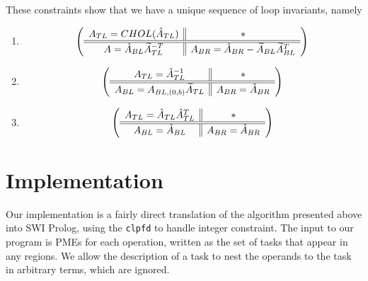 \documentclass[12pt,letterpaper]{article}
\newcommand*{\opF}{\mathcal{F}}
\begin{document}
These constraints show that we have a unique sequence of loop invariants, namely
\begin{enumerate}
\item
  \begin{equation*}
  \left( \begin{array}{c || c} A_{TL}  = CHOL(\hat{A}_{TL}) & * \\ \hline \hline A = \hat{A}_{BL}\widetilde{A}_{TL}^{-T} & A_{BR} = \hat{A}_{BR} - \widetilde{A}_{BL}\widetilde{A}_{BL}^T \end{array} \right)
  \end{equation*}
\item
  \begin{equation*}
    \left( \begin{array}{c || c} A_{TL} = \hat{A}_{TL}^{-1} & * \\ \hline \hline A_{BL} = A_{BL, (0, b)}\widetilde{A}_{TL} & A_{BR} =  \hat{A}_{BR} \end{array} \right)
  \end{equation*}
\item
  \begin{equation*}
    \left( \begin{array}{c || c} A_{TL} = \hat{A}_{TL}\hat{A}_{TL}^T & * \\ \hline \hline A_{BL} = \hat{A}_{BL} & A_{BR} = \hat{A}_{BR} \end{array} \right)
  \end{equation*}
\end{enumerate}

\section{Implementation}
Our implementation is a fairly direct translation of the algorithm presented above into SWI Prolog, using the \texttt{clpfd} to handle integer constraint.
The input to our program is PMEs for each operation, written as the set of tasks that appear in any regions.
We allow the description of a task to nest the operands to the task in arbitrary terms, which are ignored.


\end{document}
